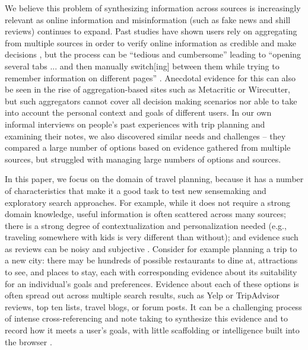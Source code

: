 We believe this problem of synthesizing information across sources is increasingly relevant as online information and misinformation (such as fake news and shill reviews) continues to expand. Past studies have shown users rely on aggregating from multiple sources in order to verify online information as credible and make decisions \cite{fox2000online,cotten2004characteristics,racherla2012perceived}, but the process can be ``tedious and cumbersome'' leading to ``opening several tabs ... and then manually switch[ing] between them while trying to remember information on different pages'' \cite{greis2017increasing}.  Anecdotal evidence for this can also be seen in the rise of aggregation-based sites such as Metacritic or Wirecutter, but such aggregators cannot cover all decision making scenarios nor able to take into account the personal context and goals of different users. In our own informal interviews on people's past experiences with trip planning and examining their notes, we also discovered similar needs and challenges -- they compared a large number of options based on evidence gathered from multiple sources, but struggled with managing large numbers of options and sources. 

In this paper, we focus on the domain of travel planning, because it has a number of characteristics that make it a good task to test new sensemaking and exploratory search approaches. For example, while it does not require a strong domain knowledge, useful information is often scattered across many sources; there is a strong degree of contextualization and personalization needed (e.g., traveling somewhere with kids is very different than without); and evidence such as reviews can be noisy and subjective \cite{zhang2012human,chen2015tripplanner}. Consider for example planning a trip to a new city: there may be hundreds of possible restaurants to dine at, attractions to see, and places to stay, each with corresponding evidence about its suitability for an individual's goals and preferences. Evidence about each of these options is often spread out across multiple search results, such as Yelp or TripAdvisor reviews, top ten lists, travel blogs, or forum posts. It can be a challenging process of intense cross-referencing and note taking to synthesize this evidence and to record how it meets a user's goals, with little scaffolding or intelligence built into the browser \cite{o1996towards,marshall1999introducing,tashman2011liquidtext,bianchi2015designing}.


